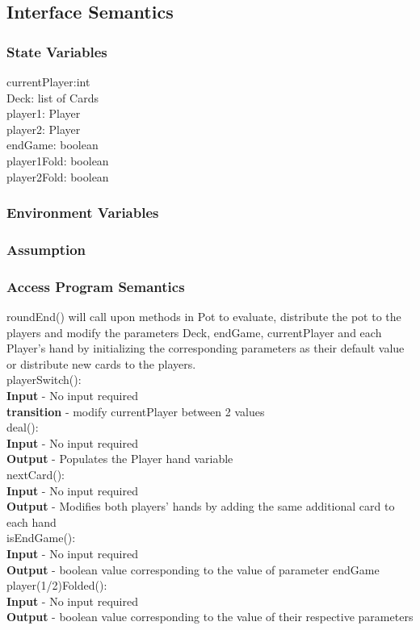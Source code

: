 \documentclass[11pt]{article}
\begin{document}
    \subsection{Interface Semantics}
    \subsubsection{State Variables}
    currentPlayer:int\\
    Deck: list of Cards\\
    player1: Player\\
    player2: Player\\
    endGame: boolean\\
    player1Fold: boolean\\
    player2Fold: boolean
    \subsubsection{Environment Variables}
    \subsubsection{Assumption}
    \subsubsection{Access Program Semantics}
 	roundEnd() will call upon methods in Pot to evaluate, distribute the pot to the players and modify the parameters Deck, endGame, currentPlayer and each Player's hand by initializing the corresponding parameters as their default value or distribute new cards to the players.\\
 	playerSwitch():\\
 	\textbf{Input} - No input required\\
 	\textbf{transition} - modify currentPlayer between 2 values\\
 	deal():\\
 	\textbf{Input} - No input required\\
 	\textbf{Output} - Populates the Player hand variable\\
 	nextCard():\\
 	\textbf{Input} - No input required\\
 	\textbf{Output} - Modifies both players' hands by adding the same additional card to each hand\\
 	isEndGame():\\
 	\textbf{Input} - No input required\\
 	\textbf{Output} - boolean value corresponding to the value of parameter endGame\\
 	player(1/2)Folded():\\
 	\textbf{Input} - No input required\\
 	\textbf{Output} - boolean value corresponding to the value of their respective parameters
 	\newline 
 	
\end{document}
